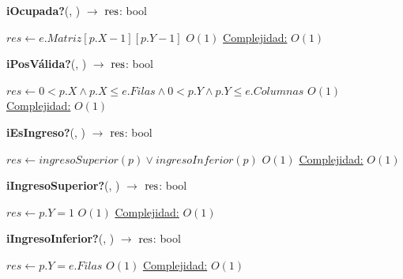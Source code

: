 \begin{Algoritmos}
\begin{algorithm}[H]{\textbf{iOcupada?}(, ) $\to$ $\res$: bool}
	\begin{algorithmic}
       	\State $res \gets e.Matriz[p.X-1][p.Y-1]$ \Comment $O(1)$
	\Statex \underline{Complejidad:} $O(1)$
	\Statex
	\end{algorithmic}
\end{algorithm}

\begin{algorithm}[H]{\textbf{iPosV\'alida?}(, ) $\to$ $\res$: bool}
	\begin{algorithmic}
       	\State $res \gets 0 < p.X \land p.X \leq e.Filas \land 0 < p.Y \land p.Y \leq e.Columnas$ \Comment $O(1)$
	\Statex \underline{Complejidad:} $O(1)$
	\Statex
	\end{algorithmic}
\end{algorithm}

\begin{algorithm}[H]{\textbf{iEsIngreso?}(, ) $\to$ $\res$: bool}
	\begin{algorithmic}
       	\State $res \gets ingresoSuperior(p) \lor ingresoInferior(p)$ \Comment $O(1)$
	\Statex \underline{Complejidad:} $O(1)$
	\Statex
	\end{algorithmic}
\end{algorithm}

\begin{algorithm}[H]{\textbf{iIngresoSuperior?}(, ) $\to$ $\res$: bool}
	\begin{algorithmic}
       	\State $res \gets p.Y = 1$ \Comment $O(1)$
	\Statex \underline{Complejidad:} $O(1)$
	\Statex
	\end{algorithmic}
\end{algorithm}

\begin{algorithm}[H]{\textbf{iIngresoInferior?}(, ) $\to$ $\res$: bool}
	\begin{algorithmic}
       	\State $res \gets p.Y = e.Filas$ \Comment $O(1)$
	\Statex \underline{Complejidad:} $O(1)$
	\Statex
	\end{algorithmic}
\end{algorithm}


\end{Algoritmos}
